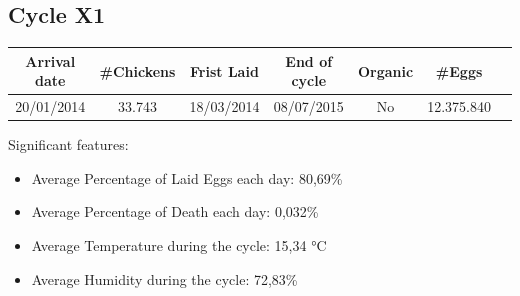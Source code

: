 \documentclass[11pt]{article}
\begin{document}
\subsection{Cycle X1}
\begin{center}
    \begin{tabular}{| c | c | c | c | c | c | c |} 
        \hline
        Arrival date & \#Chickens & Frist Laid & End of cycle & Organic & \#Eggs\\ [0.5ex] 
        \hline
        20/01/2014 & 33.743 & 18/03/2014 & 08/07/2015 & No & 12.375.840\\ 
        \hline
    \end{tabular}
\end{center}

Significant features:
\begin{itemize}
    \item Average Percentage of Laid Eggs each day: 80,69\%
    \item Average Percentage of Death each day: 0,032\%
    \item Average Temperature during the cycle: 15,34 °C
    \item Average Humidity during the cycle: 72,83\%
\end{itemize}
\end{document}
